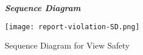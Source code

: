 \begin{figure}[H]
\begin{flushleft}\emph{\textbf{Sequence Diagram}}\end{flushleft}
\caption{Sequence Diagram for View Safety}
\label{fig:SD-View-Safety}
\centering
\texttt{[image: report-violation-SD.png]}
\end{figure}


